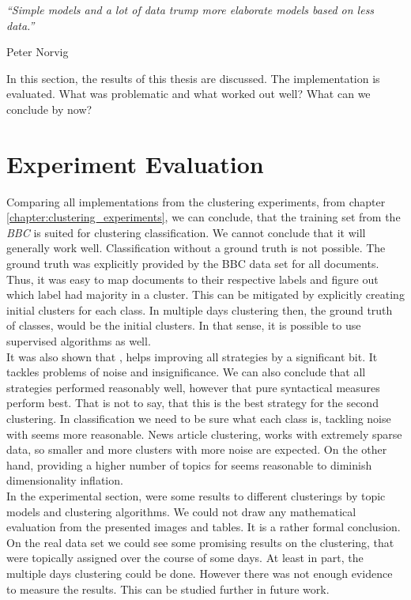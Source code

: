 \epigraph{\emph{
  ``Simple models and a lot of data trump more elaborate models based on less data.''
}}{ Peter Norvig }

In this section, the results of this thesis are discussed. The implementation is evaluated. What was problematic and what worked out well? What can we conclude by now?

\section{Experiment Evaluation}
Comparing all implementations from the clustering experiments, from chapter \ref{chapter:clustering_experiments}, we can conclude, that the training set from the \emph{BBC} is suited for clustering classification. We cannot conclude that it will generally work well. Classification without a ground truth is not possible. The ground truth was explicitly provided by the BBC data set for all documents. Thus, it was easy to map documents to their respective labels and figure out which label had majority in a cluster. This can be mitigated by explicitly creating initial clusters for each class. In multiple days clustering then, the ground truth of classes, would be the initial clusters. In that sense, it is possible to use supervised algorithms as well.\\

It was also shown that \lsa{}, helps improving all strategies by a significant bit. It tackles problems of noise and insignificance. We can also conclude that all strategies performed reasonably well, however that pure syntactical measures perform best. That is not to say, that this is the best strategy for the second clustering. In classification we need to be sure what each class is, tackling noise with \lsa{} seems more reasonable. News article clustering, works with extremely sparse data, so smaller and more clusters with more noise are expected. On the other hand, providing a higher number of topics for \lsa{} seems reasonable to diminish dimensionality inflation.\\

In the experimental section, were some results to different clusterings by topic models and clustering algorithms. We could not draw any mathematical evaluation from the presented images and tables. It is a rather formal conclusion. On the real data set we could see some promising results on the clustering, that were topically assigned over the course of some days. At least in part, the multiple days clustering could be done. However there was not enough evidence to measure the results. This can be studied further in future work.

